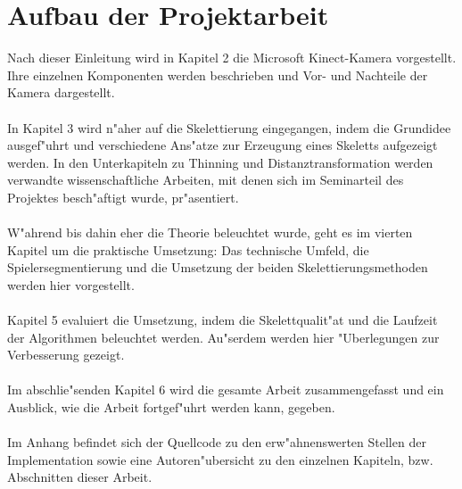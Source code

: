 \section{Aufbau der Projektarbeit}
Nach dieser Einleitung wird in Kapitel 2 die Microsoft Kinect-Kamera vorgestellt. Ihre einzelnen Komponenten werden beschrieben und Vor- und Nachteile der Kamera dargestellt. \\  \\ In Kapitel 3 wird n"aher auf die Skelettierung eingegangen, indem die Grundidee ausgef"uhrt und verschiedene Ans"atze zur Erzeugung eines Skeletts aufgezeigt werden. In den Unterkapiteln zu Thinning und Distanztransformation werden verwandte wissenschaftliche Arbeiten, mit denen sich im Seminarteil des Projektes besch"aftigt wurde, pr"asentiert. \\ \\ W"ahrend bis dahin eher die Theorie beleuchtet wurde, geht es im vierten Kapitel um die praktische Umsetzung: Das technische Umfeld, die Spielersegmentierung und die Umsetzung der beiden Skelettierungsmethoden werden hier vorgestellt. \\ \\ Kapitel 5 evaluiert die Umsetzung, indem die Skelettqualit"at und die Laufzeit der Algorithmen beleuchtet werden. Au"serdem werden hier "Uberlegungen zur Verbesserung gezeigt. \\ \\ Im abschlie"senden Kapitel 6 wird die gesamte Arbeit zusammengefasst und ein Ausblick, wie die Arbeit fortgef"uhrt werden kann, gegeben. \\ \\ Im Anhang befindet sich der Quellcode zu den erw"ahnenswerten Stellen der Implementation sowie eine Autoren"ubersicht zu den einzelnen Kapiteln, bzw. Abschnitten dieser Arbeit.